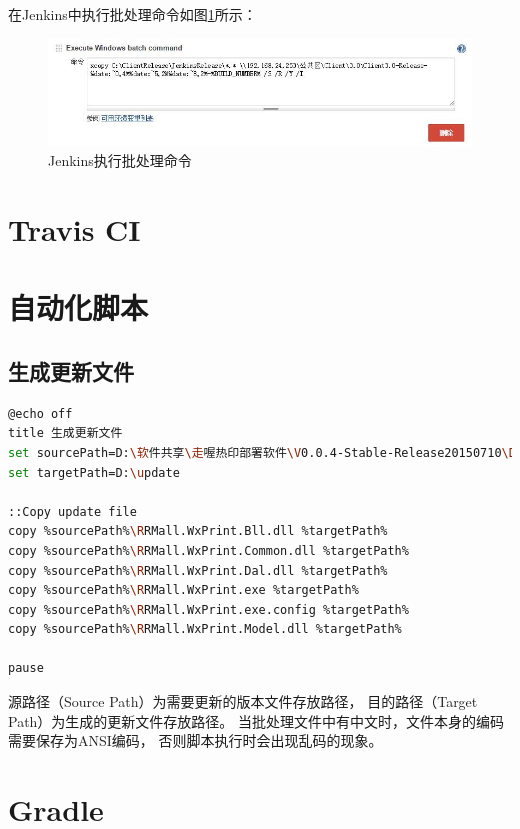 \documentclass{book}
\begin{document}
在Jenkins中执行批处理命令如图\ref{fig:JenkinsExecuteBatchCommand}所示：

\begin{figure}[htbp]
	\centering
	\includegraphics[scale=0.5]{JenkinsExecuteBatchCommand.jpg}
	\caption{Jenkins执行批处理命令}
	\label{fig:JenkinsExecuteBatchCommand}
\end{figure}

\section{Travis CI}

\section{自动化脚本}

\subsection{生成更新文件}

\begin{lstlisting}[language=Bash]
@echo off
title 生成更新文件
set sourcePath=D:\软件共享\走喔热印部署软件\V0.0.4-Stable-Release20150710\Debug
set targetPath=D:\update

::Copy update file
copy %sourcePath%\RRMall.WxPrint.Bll.dll %targetPath%
copy %sourcePath%\RRMall.WxPrint.Common.dll %targetPath%
copy %sourcePath%\RRMall.WxPrint.Dal.dll %targetPath%
copy %sourcePath%\RRMall.WxPrint.exe %targetPath%
copy %sourcePath%\RRMall.WxPrint.exe.config %targetPath%
copy %sourcePath%\RRMall.WxPrint.Model.dll %targetPath%

pause
\end{lstlisting}

源路径（Source Path）为需要更新的版本文件存放路径，
目的路径（Target Path）为生成的更新文件存放路径。
当批处理文件中有中文时，文件本身的编码需要保存为ANSI编码，
否则脚本执行时会出现乱码的现象。


\section{Gradle}
\end{document}
